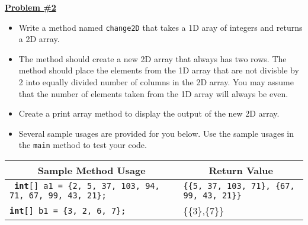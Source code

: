 \documentclass[12pt]{article}
\begin{document}
\vspace*{0.5cm}
\noindent\underline{\textbf{Problem \#2}}
\begin{itemize}
	\item Write a method named \texttt{change2D} that takes a 1D aray of integers and returns a 2D array.
	
	\item The method should create a new 2D array that always has two rows. The method should place the elements from the 1D array that are not divisble by 2 into equally divided number of columns in the 2D array. You may assume that the number of elements taken from the 1D array will always be even.
	\item Create a print array method to display the output of the new 2D array.
	\item Several sample usages are provided for you below. Use the sample usages in the \texttt{main} method to test your code. 
\end{itemize}

\begin{table}[htbp]

  \centering
    \begin{tabular}{|p{28.66em}|p{11em}|}
    \toprule
    \multicolumn{1}{|c|}{Sample Method Usage} & \multicolumn{1}{c|}{Return Value} \\
    \midrule
   \texttt{ \textbf{int}[] a1 = \{2, 5, 37, 103, 94, 71, 67, 99, 43, 21\}; }& \texttt{\{\{5, 37, 103, 71\},\newline \hspace*{.005em} \{67, 99, 43, 21\}\}} \\
    \midrule
   \hspace*{6pt}\texttt{\textbf{int}[] b1 = \{3, 2, 6, 7\}; } & \{\{3\},\newline \hspace*{3pt}\{7\}\} \\
    \bottomrule
    \end{tabular}%
\end{table}%
\end{document}
